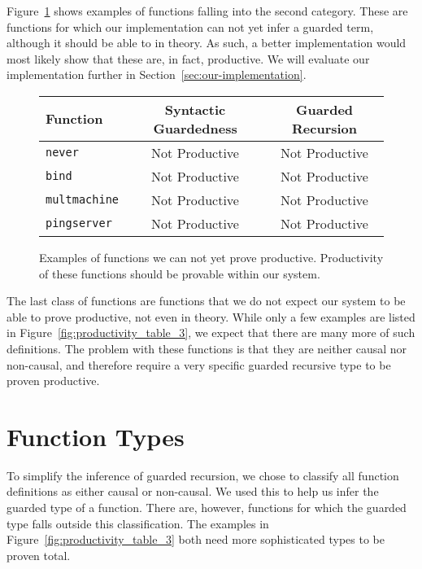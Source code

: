 Figure~\ref{fig:productivity_table_2} shows examples of functions falling into
the second category. These are functions for which our implementation can not
yet infer a guarded term, although it should be able to in theory. As such, a better
implementation would most likely show that these are, in fact, productive. We
will evaluate our implementation further in Section~\ref{sec:our-implementation}.

\begin{figure}[h]
\begin{center}
  \begin{tabular}{| l | c | c |} \hline
    Function & Syntactic Guardedness & Guarded Recursion \\ \hline
    \texttt{never} & Not Productive & Not Productive \\ \hline
    \texttt{bind} & Not Productive & Not Productive \\ \hline
    \texttt{multmachine} & Not Productive & Not Productive \\ \hline
    \texttt{pingserver} & Not Productive & Not Productive \\ \hline
  \end{tabular}
\end{center}
  \caption{Examples of functions we can not yet prove productive. Productivity
    of these
    functions should be provable within our system.}
  \label{fig:productivity_table_2}
\end{figure}

The last class of functions are functions that we do not expect our system to be
able to prove productive, not even in theory. While only a few examples are listed in
Figure~\ref{fig:productivity_table_3}, we expect that there are many more of such
definitions. The problem with these functions is that they are neither causal
nor non-causal, and therefore require a very specific guarded recursive type to be proven productive.

\section{Function Types}
\label{sec:function-types}
To simplify the inference of guarded recursion, we chose to classify all
function definitions as either causal or non-causal. We used this to help us infer the guarded type of a function. There
are, however, functions for which the guarded type falls outside this
classification. The examples in Figure~\ref{fig:productivity_table_3} both need
more sophisticated types to be proven total.

